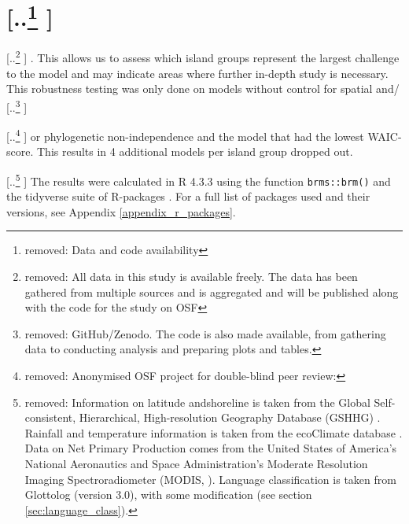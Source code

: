 \documentclass[unnumsec,webpdf,modern,medium]{oup-authoring-template}
\providecommand{\DIFaddtex}[1]{{\protect\color{blue} \sf #1}} %
\providecommand{\DIFdeltex}[1]{{\protect\color{red} [..\footnote{removed: #1} ]}} %
\providecommand{\DIFaddbegin}{} %
\providecommand{\DIFaddend}{} %
\providecommand{\DIFdelbegin}{} %
\providecommand{\DIFdelend}{} %
\providecommand{\DIFadd}[1]{\texorpdfstring{\DIFaddtex{#1}}{#1}} %
\providecommand{\DIFdel}[1]{\texorpdfstring{\DIFdeltex{#1}}{}} %
\newcommand{\DIFscaledelfig}{0.5}
\newlength{\DIFdelgraphicswidth} %
\newlength{\DIFdelgraphicsheight} %
\newcommand{\DIFaddincludegraphics}[2][]{{\color{blue}\fbox{\DIFOincludegraphics[#1]{#2}}}} %
\newcommand{\DIFdelincludegraphics}[2][]{%
\sbox{\DIFdelgraphicsbox}{\DIFOincludegraphics[#1]{#2}}%
\settoboxwidth{\DIFdelgraphicswidth}{\DIFdelgraphicsbox} %
\settoboxtotalheight{\DIFdelgraphicsheight}{\DIFdelgraphicsbox} %
\scalebox{\DIFscaledelfig}{%
\parbox[b]{\DIFdelgraphicswidth}{\usebox{\DIFdelgraphicsbox}\\[-\baselineskip] \rule{\DIFdelgraphicswidth}{0em}}\llap{\resizebox{\DIFdelgraphicswidth}{\DIFdelgraphicsheight}{%
\setlength{\unitlength}{\DIFdelgraphicswidth}%
\begin{picture}(1,1)%
\thicklines\linethickness{2pt} %
{\color[rgb]{1,0,0}\put(0,0){\framebox(1,1){}}}%
{\color[rgb]{1,0,0}\put(0,0){\line( 1,1){1}}}%
{\color[rgb]{1,0,0}\put(0,1){\line(1,-1){1}}}%
\end{picture}%
}\hspace*{3pt}}} %
} %
\DeclareRobustCommand{\DIFaddbegin}{\DIFOaddbegin \let\includegraphics\DIFaddincludegraphics} %
\DeclareRobustCommand{\DIFaddend}{\DIFOaddend \let\includegraphics\DIFOincludegraphics} %
\DeclareRobustCommand{\DIFdelbegin}{\DIFOdelbegin \let\includegraphics\DIFdelincludegraphics} %
\DeclareRobustCommand{\DIFdelend}{\DIFOaddend \let\includegraphics\DIFOincludegraphics} %
\begin{document}





\section{\DIFdel{Data and code availability}}
\addtocounter{section}{-1}%

\DIFdel{All data in this study is available freely. The data has been gathered from multiple sources and is aggregated and will be published along with the code for the study on OSF}\DIFdelend \DIFaddbegin \DIFadd{. This allows us to assess which island groups represent the largest challenge to the model and may indicate areas where further in-depth study is necessary. This robustness testing was only done on models without control for spatial and}\DIFaddend /\DIFdelbegin \DIFdel{GitHub/Zenodo. The code is also made available, from gathering data to conducting analysis and preparing plots and tables. }%

\DIFdel{Anonymised OSF project for double-blind peer review: }%
\DIFdelend \DIFaddbegin \DIFadd{or phylogenetic non-independence and the model that had the lowest WAIC-score. This results in 4 additional models per island group dropped out}\DIFaddend .

\DIFdelbegin \DIFdel{Information on latitude andshoreline is taken from the Global Self-consistent, Hierarchical, High-resolution Geography Database (GSHHG) \citep{wessel1996global}. Rainfall and temperature information is taken from the ecoClimate database \citep{ecoclimate}. Data on Net Primary Production comes from the United States of America's National Aeronautics and Space Administration's Moderate Resolution Imaging Spectroradiometer (MODIS, \citet{running2021modis_terra, running2021modis_aqua}). Language classification is taken from Glottolog (version 3.0), with some modification (see section \ref{sec:language_class}).
}\DIFdelend \DIFaddbegin \DIFadd{The results were calculated in R 4.3.3 \citep{R} using the function \texttt{brms::brm()} \citep{burkner2017brms} and the tidyverse suite of R-packages \citep{tidyverse13}. For a full list of packages used and their versions, see Appendix \ref{appendix_r_packages}.
}\DIFaddend 
\end{document}
